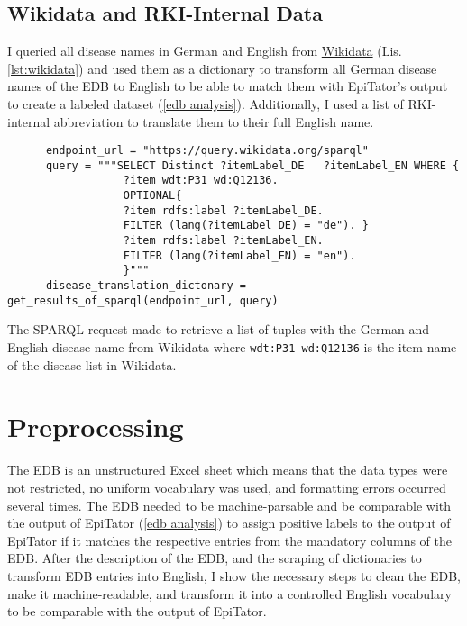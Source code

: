 \subsection{Wikidata and RKI-Internal Data}\label{wikidata}
  I queried all disease names in German and English from \href{https://www.wikidata.org/wiki/Wikidata:Main_Page}{Wikidata} (Lis. \ref{lst:wikidata}) and used them as a dictionary to transform all German disease names of the EDB to English to be able to match them with EpiTator's output to create a labeled dataset (\ref{edb analysis}).
  Additionally, I used a list of RKI-internal abbreviation to translate them to their full English name.

  \begin{listing}[h]
    \begin{verbatim}
      endpoint_url = "https://query.wikidata.org/sparql"
      query = """SELECT Distinct ?itemLabel_DE   ?itemLabel_EN WHERE {
                  ?item wdt:P31 wd:Q12136.
                  OPTIONAL{
                  ?item rdfs:label ?itemLabel_DE.
                  FILTER (lang(?itemLabel_DE) = "de"). }
                  ?item rdfs:label ?itemLabel_EN.
                  FILTER (lang(?itemLabel_EN) = "en").
                  }"""
      disease_translation_dictonary = get_results_of_sparql(endpoint_url, query)
    \end{verbatim}
    \caption{The SPARQL request made to retrieve a list of tuples with the German and English disease name from Wikidata where \texttt{wdt:P31 wd:Q12136} is the item name of the disease list in Wikidata.}
    \label{lst:wikidata}
  \end{listing}

\section{Preprocessing}
  The EDB is an unstructured Excel sheet which means that the data types were not restricted, no uniform vocabulary was used, and formatting errors occurred several times.
  The EDB needed to be machine-parsable and be comparable with the output of EpiTator (\ref{edb analysis}) to assign positive labels to the output of EpiTator if it matches the respective entries from the mandatory columns of the EDB.
  After the description of the EDB, and the scraping of dictionaries to transform EDB entries into English, I show the necessary steps to clean the EDB, make it machine-readable, and transform it into a controlled English vocabulary to be comparable with the output of EpiTator.

